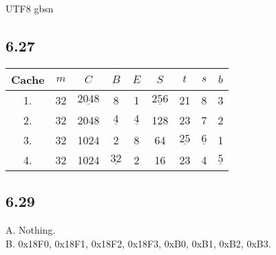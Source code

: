 \documentclass {article}
\begin{document}
\begin {CJK*} {UTF8} {gbsn}
			\subsection{6.27}
				\begin{table}[h]
					\begin{tabular}{ccccccccc}
						Cache & $m$ & $C$                                       & $B$                                     & $E$                                    & $S$                                      & $t$                                     & $s$                                    & $b$                                    \\ \hline
						1.    & 32  & {\color[HTML]{34CDF9} $\underline{2048}$} & 8                                       & 1                                      & {\color[HTML]{34CDF9} $\underline{256}$} & 21                                      & 8                                      & 3                                      \\
						2.    & 32  & 2048                                      & {\color[HTML]{34CDF9} $\underline{4}$}  & {\color[HTML]{34CDF9} $\underline{4}$} & 128                                      & 23                                      & 7                                      & 2                                      \\
						3.    & 32  & 1024                                      & 2                                       & 8                                      & 64                                       & {\color[HTML]{34CDF9} $\underline{25}$} & {\color[HTML]{34CDF9} $\underline{6}$} & 1                                      \\
						4.    & 32  & 1024                                      & {\color[HTML]{34CDF9} $\underline{32}$} & 2                                      & 16                                       & 23                                      & 4                                      & {\color[HTML]{34CDF9} $\underline{5}$}
					\end{tabular}
				\end{table}

			\subsection{6.29}
				A. Nothing.\\

				B. 0x18F0, 0x18F1, 0x18F2, 0x18F3, 0xB0, 0xB1, 0xB2, 0xB3.\\


\end{CJK*}
\end{document}
